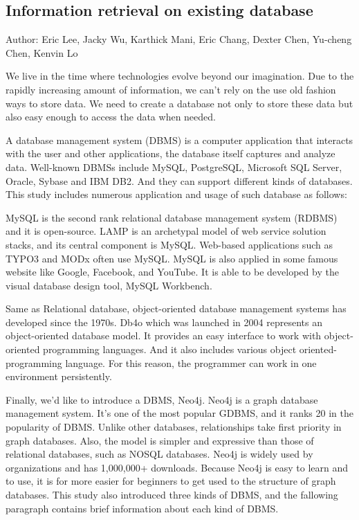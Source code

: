 	
\subsection{Information retrieval on existing database}
Author: Eric Lee, Jacky Wu, Karthick Mani, Eric Chang, Dexter Chen, Yu-cheng Chen, Kenvin Lo

We live in the time where technologies evolve beyond our imagination. Due to the rapidly increasing amount of information, we can't rely on the use old fashion ways to store data. We need to create a database not only to store these data but also easy enough to access the data when needed.

A database management system (DBMS) is a computer  application that interacts with the user and other applications, the database itself  captures and analyze data. Well-known DBMSs include MySQL, PostgreSQL, Microsoft SQL Server, Oracle, Sybase and IBM DB2. And they can support different kinds of databases. This study includes numerous application and usage of such database as follows:

MySQL is the second rank relational database management system (RDBMS) and it is open-source. LAMP is an archetypal model of web service solution stacks, and its central component is MySQL. Web-based applications such as TYPO3 and MODx often use MySQL. MySQL is also applied in some famous website like Google, Facebook, and YouTube. It is able to be developed by the visual database design tool, MySQL Workbench.

Same as Relational database, object-oriented database management systems has developed since the 1970s. Db4o which was launched in 2004 represents an object-oriented database model. It provides an easy interface to work with object-oriented programming languages. And it also includes various object oriented-programming language. For this reason, the programmer can work in one environment persistently.

Finally, we’d like to introduce a DBMS, Neo4j. Neo4j is a graph database management system. It’s one of the most popular GDBMS, and it ranks 20 in the popularity of DBMS. Unlike other databases, relationships take first priority in graph databases. Also, the model is simpler and expressive than those of relational databases, such as NOSQL databases. Neo4j is widely used by organizations and has 1,000,000+ downloads. Because Neo4j is easy to learn and to use, it is for more easier for beginners to get used to the structure of graph databases. This study also introduced three kinds of DBMS, and the fallowing paragraph contains brief information about each kind of DBMS.

